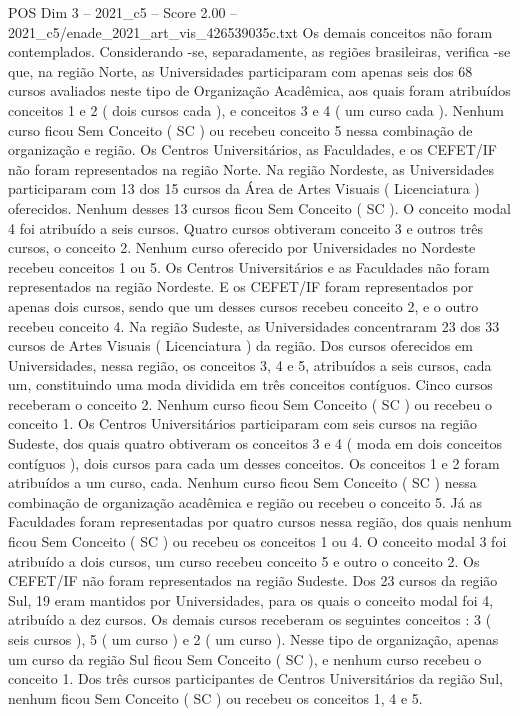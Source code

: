 \begin{textsample}{POS Dim 3 – 2021\_c5 – Score 2.00 – 2021\_c5/enade\_2021\_art\_vis\_426539035c.txt}
Os demais conceitos não foram contemplados.
Considerando -se, separadamente, as regiões brasileiras, verifica -se que, na região Norte, as Universidades participaram com apenas seis dos 68 cursos avaliados neste tipo de Organização Acadêmica, aos quais foram atribuídos conceitos 1 e 2 ( dois cursos cada ), e conceitos 3 e 4 ( um curso cada ).
Nenhum curso ficou Sem Conceito ( SC ) ou recebeu conceito 5 nessa combinação de organização e região.
Os Centros Universitários, as Faculdades, e os CEFET/IF não foram representados na região Norte.
Na região Nordeste, as Universidades participaram com 13 dos 15 cursos da Área de Artes Visuais ( Licenciatura ) oferecidos.
Nenhum desses 13 cursos ficou Sem Conceito ( SC ).
O conceito modal 4 foi atribuído a seis cursos.
Quatro cursos obtiveram conceito 3 e outros três cursos, o conceito 2.
Nenhum curso oferecido por Universidades no Nordeste recebeu conceitos 1 ou 5.
Os Centros Universitários e as Faculdades não foram representados na região Nordeste.
E os CEFET/IF foram representados por apenas dois cursos, sendo que um desses cursos recebeu conceito 2, e o outro recebeu conceito 4.
Na região Sudeste, as Universidades concentraram 23 dos 33 cursos de Artes Visuais ( Licenciatura ) da região.
Dos cursos oferecidos em Universidades, nessa região, os conceitos 3, 4 e 5, atribuídos a seis cursos, cada um, constituindo uma moda dividida em três conceitos contíguos.
Cinco cursos receberam o conceito 2.
Nenhum curso ficou Sem Conceito ( SC ) ou recebeu o conceito 1.
Os Centros Universitários participaram com seis cursos na região Sudeste, dos quais quatro obtiveram os conceitos 3 e 4 ( moda em dois conceitos contíguos ), dois cursos para cada um desses conceitos.
Os conceitos 1 e 2 foram atribuídos a um curso, cada.
Nenhum curso ficou Sem Conceito ( SC ) nessa combinação de organização acadêmica e região ou recebeu o conceito 5.
Já as Faculdades foram representadas por quatro cursos nessa região, dos quais nenhum ficou Sem Conceito ( SC ) ou recebeu os conceitos 1 ou 4.
O conceito modal 3 foi atribuído a dois cursos, um curso recebeu conceito 5 e outro o conceito 2.
Os CEFET/IF não foram representados na região Sudeste.
Dos 23 cursos da região Sul, 19 eram mantidos por Universidades, para os quais o conceito modal foi 4, atribuído a dez cursos.
Os demais cursos receberam os seguintes conceitos : 3 ( seis cursos ), 5 ( um curso ) e 2 ( um curso ).
Nesse tipo de organização, apenas um curso da região Sul ficou Sem Conceito ( SC ), e nenhum curso recebeu o conceito 1.
Dos três cursos participantes de Centros Universitários da região Sul, nenhum ficou Sem Conceito ( SC ) ou recebeu os conceitos 1, 4 e 5.

\end{textsample}
